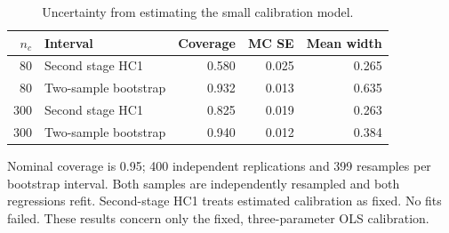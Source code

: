 \begin{table}[htbp]\centering\small
\caption{Uncertainty from estimating the small calibration model.}
\label{tab:coverage}
\begin{tabular}{rlrrr}\toprule
$n_c$ & Interval & Coverage & MC SE & Mean width \\\midrule
80 & Second stage HC1 & 0.580 & 0.025 & 0.265 \\
80 & Two-sample bootstrap & 0.932 & 0.013 & 0.635 \\
300 & Second stage HC1 & 0.825 & 0.019 & 0.263 \\
300 & Two-sample bootstrap & 0.940 & 0.012 & 0.384 \\
\bottomrule\end{tabular}
\par\smallskip\begin{minipage}{0.96\textwidth}\footnotesize
Nominal coverage is 0.95; 400 independent replications and 399 resamples per bootstrap interval. Both samples are independently resampled and both regressions refit. Second-stage HC1 treats estimated calibration as fixed. No fits failed. These results concern only the fixed, three-parameter OLS calibration.
\end{minipage}\end{table}
